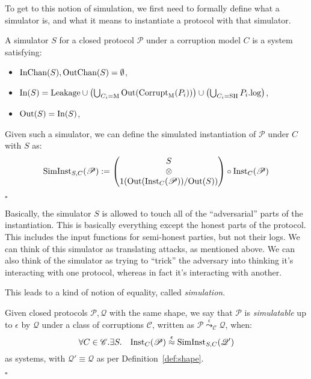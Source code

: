 To get to this notion of simulation, we first need to formally
define what a simulator is, and what it means to instantiate
a protocol with that simulator.

\begin{definition}
  A simulator $S$ for a closed protocol $\mathscr{P}$ under a corruption
  model $C$ is a system satisfying:
  \begin{itemize}
    \item $\text{InChan}(S), \text{OutChan}(S) = \emptyset$,
    \item $\text{In}(S) = \text{Leakage} \cup \left(\bigcup_{C_i = \text{M}} \text{Out}(\text{Corrupt}_{\text{M}}(P_i))\right) \cup \left(\bigcup_{C_i = \text{SH}} P_i.\text{log}\right)$,
    \item $\text{Out}(S) = \text{In}(S)$,
  \end{itemize}

  Given such a simulator, we can define the simulated instantiation
  of $\mathscr{P}$ under $C$ with $S$ as:
  $$
  \text{SimInst}_{S, C}(\mathscr{P}) := 
  \begin{pmatrix}
    S\cr
    \otimes\cr
    1(\text{Out}(\text{Inst}_C(\mathscr{P})) / \text{Out}(S))
  \end{pmatrix}
  \circ \text{Inst}_C(\mathscr{P})
  $$

  $\square$
\end{definition}

Basically, the simulator $S$ is allowed to touch all of the
``adversarial'' parts of the instantiation.
This is basically everything except the honest parts
of the protocol.
This includes the input functions for semi-honest parties,
but not their logs.
We can think of this simulator as translating attacks, as mentioned above.
We can also think of the simulator as trying to ``trick''
the adversary into thinking it's interacting
with one protocol, whereas in fact it's interacting with another.

This leads to a kind of notion of equality, called
\emph{simulation}.

\begin{definition}[Simulatability]
  Given closed protocols $\mathscr{P}, \mathscr{Q}$ with the same shape,
  we say that $\mathscr{P}$ is \emph{simulatable} up to $\epsilon$ by $\mathscr{Q}$
  under a class of corruptions $\mathscr{C}$,
  written as $\mathscr{P} \overset{\epsilon}{\leadsto}_{\mathscr{C}} \mathscr{Q}$,
  when:
  $$
  \forall C \in \mathscr{C}.\exists S.\quad \text{Inst}_C(\mathscr{P}) \overset{\epsilon}{\approx} \text{SimInst}_{S, C}(\mathscr{Q}')
  $$
  as systems, with $\mathscr{Q}' \equiv \mathscr{Q}$ as per 
  Definition~\ref{def:shape}.

  $\square$
\end{definition}

